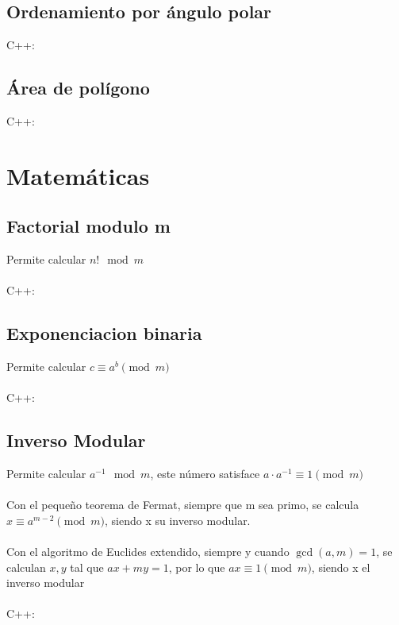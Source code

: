 \documentclass{article}
\begin{document}
    \subsection{Ordenamiento por ángulo polar}
        C++:
        
    \subsection{Área de polígono}
        C++:
        
      
\pagebreak
\section{Matemáticas}
    \subsection{Factorial modulo m}
        Permite calcular $n! \mod{m}$
        \\ \\
        C++:
        
    \subsection{Exponenciacion binaria}
        Permite calcular $c \equiv a^b\pmod{m}$
        \\ \\
        C++:
        

    \subsection{Inverso Modular}
        Permite calcular $ a^{-1} \mod{m}$, este número satisface $a \cdot a^{-1} \equiv 1 \pmod{m}$
        \\ \\
        Con el pequeño teorema de Fermat, siempre que m sea primo, se calcula $x \equiv a^{m - 2} \pmod{m}$, siendo x su inverso modular.
        \\ \\
        Con el algoritmo de Euclides extendido, siempre y cuando $\gcd(a, m) = 1$, se calculan $x, y$ tal que $ ax + my = 1$, por lo que
        $ax \equiv 1 \pmod{m}$, siendo x el inverso modular 
        \\ \\
        C++:
        
\end{document}
